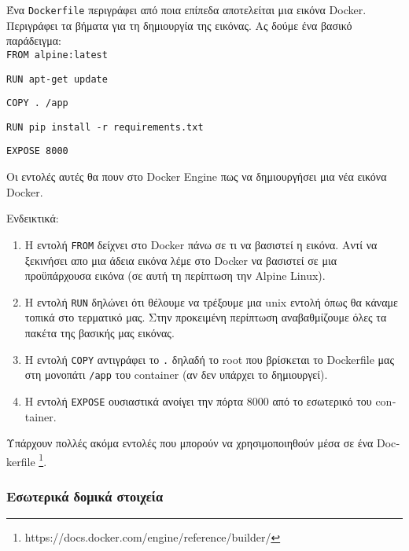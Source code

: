 Ένα \texttt{\textlatin{Dockerfile}} περιγράφει από ποια επίπεδα αποτελείται
μια εικόνα \textlatin{Docker}. Περιγράφει τα βήματα για τη δημιουργία της
εικόνας. Ας δούμε ένα βασικό παράδειγμα: \\

\texttt{\textlatin{FROM alpine:latest}}

\texttt{\textlatin{RUN apt-get update}}

\texttt{\textlatin{COPY . /app}}

\texttt{\textlatin{RUN pip install -r requirements.txt}}

\texttt{\textlatin{EXPOSE 8000}}

Οι εντολές αυτές θα πουν στο \textlatin{Docker Engine} πως να δημιουργήσει μια
νέα εικόνα \textlatin{Docker}.

Ενδεικτικά:

\begin{enumerate}
 
   \item H εντολή \texttt{\textlatin{FROM}} δείχνει στο \textlatin{Docker} πάνω
    σε τι να βασιστεί η εικόνα. Αντί να ξεκινήσει απο μια άδεια εικόνα λέμε
    στο \textlatin{Docker} να βασιστεί σε μια προϋπάρχουσα εικόνα (σε αυτή
    τη περίπτωση την \textlatin{Alpine Linux}).

    \item H εντολή \texttt{\textlatin{RUN}} δηλώνει ότι θέλουμε να τρέξουμε μια
    \textlatin{unix} εντολή όπως θα κάναμε τοπικά στο τερματικό μας. Στην
    προκειμένη περίπτωση αναβαθμίζουμε όλες τα πακέτα της βασικής μας
    εικόνας.

    \item H εντολή \texttt{\textlatin{COPY}} αντιγράφει το \texttt{.} δηλαδή το
    \textlatin{root} που βρίσκεται το \textlatin{Dockerfile} μας στη μονοπάτι
    \texttt{\textlatin{/app}} του \textlatin{container} (αν δεν υπάρχει το
    δημιουργεί). 

    \item Η εντολή \texttt{\textlatin{EXPOSE}} ουσιαστικά ανοίγει την πόρτα
    8000 από το εσωτερικό του \textlatin{container}.

\end{enumerate}

Υπάρχουν πολλές ακόμα εντολές που μπορούν να χρησιμοποιηθούν μέσα σε ένα
\textlatin{Dockerfile} 
\footnote{\textlatin{https://docs.docker.com/engine/reference/builder/}}.


\subsubsection{Εσωτερικά δομικά στοιχεία}


